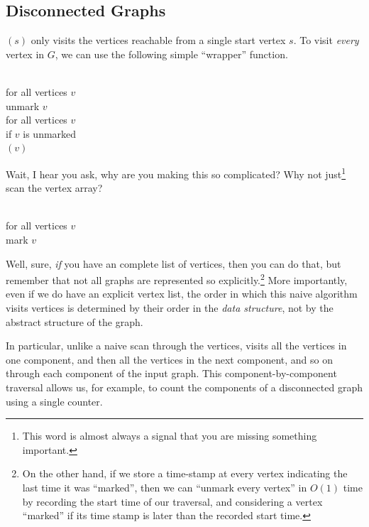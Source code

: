 \subsection{Disconnected Graphs}

$(s)$ only visits the vertices reachable from a single start vertex $s$.
To visit \textit{every} vertex in $G$, we can use the following simple “wrapper” function.

\begin{pseudocode}
\\
for all vertices $v$\\
\Indent unmark $v$\\
for all vertices $v$\\
\Indent if $v$ is unmarked\\
\Indent\Indent {}$(v)$
\end{pseudocode}
\noindent Wait, I hear you ask, why are you making this so complicated?
Why not just\footnote{This word is almost always a signal that you are missing something important.} scan the vertex array?

\begin{pseudocode}
\\
for all vertices $v$\\
\Indent mark $v$
\end{pseudocode}
\noindent Well, sure, \textit{if} you have an complete list of vertices, then you can do that, but remember that not all graphs are represented so explicitly.\footnote{On the other hand, if we store a time-stamp at every vertex indicating the last time it was “marked”, then we can “unmark every vertex” in $O(1)$ time by recording the start time of our traversal, and considering a vertex “marked” if its time stamp is later than the recorded start time.}
More importantly, even if we do have an explicit vertex list, the order in which this naive algorithm visits vertices is determined by their order in the \textit{data structure}, not by the abstract structure of the graph.

In particular, unlike a naive scan through the vertices,  visits all the vertices in one component, and then all the vertices in the next component, and so on through each component of the input graph.
This component-by-component traversal allows us, for example, to count the components of a disconnected graph using a single counter.

